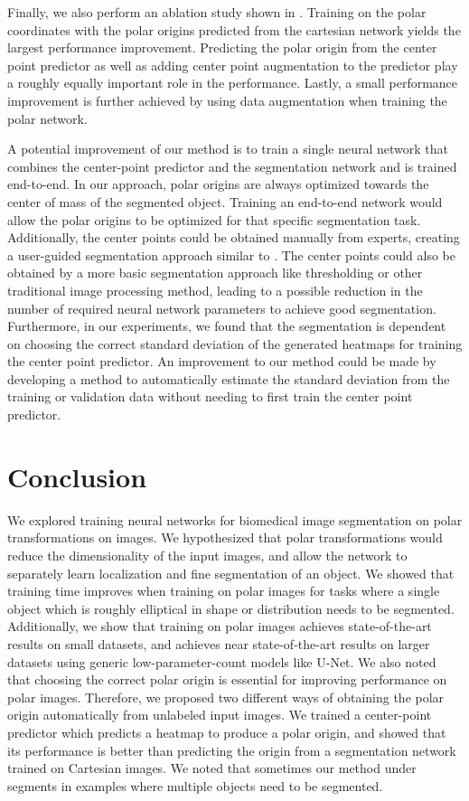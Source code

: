 Finally, we also perform an ablation study shown in . Training on the polar coordinates with the polar origins predicted from the cartesian network yields the largest performance improvement. Predicting the polar origin from the center point predictor as well as adding center point augmentation to the predictor play a roughly equally important role in the performance. Lastly, a small performance improvement is further achieved by using data augmentation when training the polar network.

A potential improvement of our method is to train a single neural network that combines the center-point 
predictor and the segmentation network and is trained end-to-end. In our approach, polar origins are always 
optimized towards the center of mass of the segmented object. Training an end-to-end network would allow 
the polar origins to be optimized for that specific segmentation task. Additionally, the center points could 
be obtained manually from experts, creating a user-guided segmentation approach similar to 
\cite{kimCNNBasedUGS2018}. The center points could also be obtained by a more basic segmentation approach 
like thresholding or other traditional image processing method, leading to a possible reduction in the 
number of required neural network parameters to achieve good segmentation. Furthermore, in our experiments,
we found that the segmentation is dependent on choosing the correct standard deviation of the generated 
heatmaps for training the center point predictor. An improvement to our method could be made by developing
a method to automatically estimate the standard deviation from the training or validation data without needing
to first train the center point predictor.

  \section{Conclusion}
  
  
We explored training neural networks for biomedical image segmentation on polar transformations on images.
We hypothesized that polar transformations would reduce the dimensionality of the input images, and allow
the network to separately learn localization and fine segmentation of an object.
We showed that training time improves when training on polar images for 
tasks where a single object 
which is roughly elliptical in shape or distribution needs to be segmented. Additionally, we show that training on polar
images achieves state-of-the-art results on small datasets, and achieves near state-of-the-art results on larger
datasets using generic low-parameter-count models like U-Net. We also noted that choosing the correct 
polar origin is essential for improving performance on polar images. Therefore, we proposed two different 
ways of obtaining the polar origin automatically from unlabeled input images. We trained a center-point 
predictor which predicts a heatmap to produce a polar origin, and showed that its performance is better 
than predicting the origin from a segmentation network trained on Cartesian images.
We noted that sometimes our method under segments in examples where multiple objects need to be segmented.

